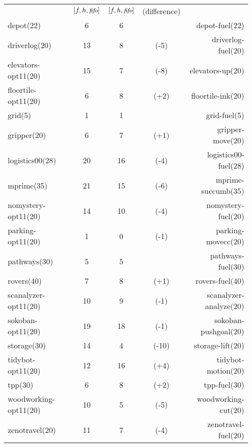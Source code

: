 \begin{center}
\begin{tabular}{|lc|ccr|}
 & $[f,h,{\small\textit{fifo}}]$ & $[f,h,{\small\textit{fifo}}]$ & (difference) & \\
depot(22) & 6 & 6 &  & depot-fuel(22)\\
driverlog(20) & 13 & 8 & (-5) & driverlog-fuel(20)\\
elevators-opt11(20) & 15 & 7 & (-8) & elevators-up(20)\\
floortile-opt11(20) & 6 & 8 & (+2) & floortile-ink(20)\\
grid(5) & 1 & 1 &  & grid-fuel(5)\\
gripper(20) & 6 & 7 & (+1) & gripper-move(20)\\
logistics00(28) & 20 & 16 & (-4) & logistics00-fuel(28)\\
mprime(35) & 21 & 15 & (-6) & mprime-succumb(35)\\
nomystery-opt11(20) & 14 & 10 & (-4) & nomystery-fuel(20)\\
parking-opt11(20) & 1 & 0 & (-1) & parking-movecc(20)\\
pathways(30) & 5 & 5 &  & pathways-fuel(30)\\
rovers(40) & 7 & 8 & (+1) & rovers-fuel(40)\\
scanalyzer-opt11(20) & 10 & 9 & (-1) & scanalyzer-analyze(20)\\
sokoban-opt11(20) & 19 & 18 & (-1) & sokoban-pushgoal(20)\\
storage(30) & 14 & 4 & (-10) & storage-lift(20)\\
tidybot-opt11(20) & 12 & 16 & (+4) & tidybot-motion(20)\\
tpp(30) & 6 & 8 & (+2) & tpp-fuel(30)\\
woodworking-opt11(20) & 10 & 5 & (-5) & woodworking-cut(20)\\
zenotravel(20) & 11 & 7 & (-4) & zenotravel-fuel(20)\\
\end{tabular}
\end{center}
